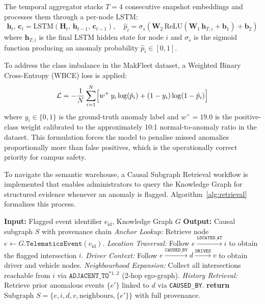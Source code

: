 \documentclass{ieeeaccess}
\begin{document}
The temporal aggregator stacks $T=4$ consecutive snapshot embeddings
and processes them through a per-node LSTM:
\begin{equation}
\mathbf{h}_t,\,\mathbf{c}_t =
  \text{LSTM}\!\left(\mathbf{H}_t,\,\mathbf{h}_{t-1},\,
  \mathbf{c}_{t-1}\right), \quad
\hat{p}_i = \sigma_s\!\left(
  \mathbf{W}_2\,\text{ReLU}(\mathbf{W}_1\,\mathbf{h}_{T,i}+\mathbf{b}_1)
  +\mathbf{b}_2\right)
\end{equation}
where $\mathbf{h}_{T,i}$ is the final LSTM hidden state for node $i$
and $\sigma_s$ is the sigmoid function producing an anomaly probability
$\hat{p}_i \in [0,1]$.

To address the class imbalance in the MakFleet dataset, a
Weighted Binary Cross-Entropy (WBCE) loss is applied:
\begin{equation}
\mathcal{L} = -\frac{1}{N}\sum_{i=1}^{N}
  \Bigl[w^{+}\,y_i\log(\hat{p}_i)
  + (1-y_i)\log(1-\hat{p}_i)\Bigr]
\end{equation}
where $y_i \in \{0,1\}$ is the ground-truth anomaly label and
$w^{+} = 19.0$ is the positive-class weight calibrated to the
approximately 10:1 normal-to-anomaly ratio in the dataset. This
formulation forces the model to penalise missed anomalies
proportionally more than false positives, which is the operationally
correct priority for campus safety.

To navigate the semantic warehouse, a Causal Subgraph Retrieval
workflow is implemented that enables administrators to query the
Knowledge Graph for structured evidence whenever an anomaly is flagged.
Algorithm~\ref{alg:retrieval} formalises this process.

\begin{algorithm}[!t]
\caption{Causal Subgraph Retrieval for Anomaly Evidence}
\label{alg:retrieval}
\begin{algorithmic}[1]
\STATE \textbf{Input:} Flagged event identifier $e_{\text{id}}$,
       Knowledge Graph $G$
\STATE \textbf{Output:} Causal subgraph $S$ with provenance chain
\STATE \textit{Anchor Lookup:} Retrieve node
       $e \leftarrow G.\texttt{TelematicsEvent}(e_{\text{id}})$.
\STATE \textit{Location Traversal:} Follow
       $e \xrightarrow{\texttt{LOCATED\_AT}} i$ to obtain the
       flagged intersection $i$.
\STATE \textit{Driver Context:} Follow
       $e \xrightarrow{\texttt{CAUSED\_BY}} d \xrightarrow{\texttt{DRIVES}} v$
       to obtain driver and vehicle nodes.
\STATE \textit{Neighbourhood Expansion:} Collect all intersections
       reachable from $i$ via
       $\texttt{ADJACENT\_TO}^{*1..2}$ (2-hop ego-graph).
\STATE \textit{History Retrieval:} Retrieve prior anomalous events
       $\{e'\}$ linked to $d$ via \texttt{CAUSED\_BY}.
\STATE \textbf{return} Subgraph $S = \{e, i, d, v,
       \text{neighbours}, \{e'\}\}$ with full provenance.
\end{algorithmic}
\end{algorithm}
\end{document}

